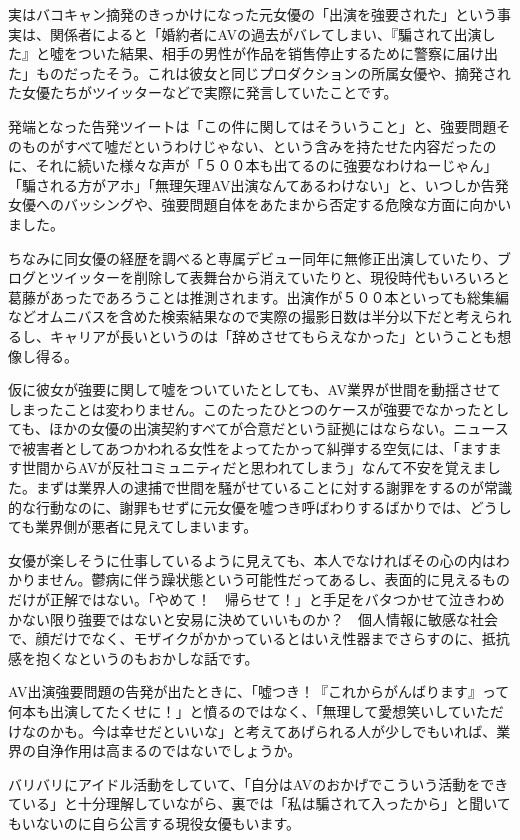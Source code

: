 \documentclass[12pt,UTF8]{ctexbook}
\begin{document}
実はバコキャン摘発のきっかけになった元女優の「出演を強要された」という事実は、関係者によると「婚約者にAVの過去がバレてしまい、『騙されて出演した』と噓をついた結果、相手の男性が作品を销售停止するために警察に届け出た」ものだったそう。これは彼女と同じプロダクションの所属女優や、摘発された女優たちがツイッターなどで実際に発言していたことです。

発端となった告発ツイートは「この件に関してはそういうこと」と、強要問題そのものがすべて噓だというわけじゃない、という含みを持たせた内容だったのに、それに続いた様々な声が「５００本も出てるのに強要なわけねーじゃん」「騙される方がアホ」「無理矢理AV出演なんてあるわけない」と、いつしか告発女優へのバッシングや、強要問題自体をあたまから否定する危険な方面に向かいました。

ちなみに同女優の経歴を調べると専属デビュー同年に無修正出演していたり、ブログとツイッターを削除して表舞台から消えていたりと、現役時代もいろいろと葛藤があったであろうことは推測されます。出演作が５００本といっても総集編などオムニバスを含めた検索結果なので実際の撮影日数は半分以下だと考えられるし、キャリアが長いというのは「辞めさせてもらえなかった」ということも想像し得る。

仮に彼女が強要に関して噓をついていたとしても、AV業界が世間を動揺させてしまったことは変わりません。このたったひとつのケースが強要でなかったとしても、ほかの女優の出演契約すべてが合意だという証拠にはならない。ニュースで被害者としてあつかわれる女性をよってたかって糾弾する空気には、「ますます世間からAVが反社コミュニティだと思われてしまう」なんて不安を覚えました。まずは業界人の逮捕で世間を騒がせていることに対する謝罪をするのが常識的な行動なのに、謝罪もせずに元女優を噓つき呼ばわりするばかりでは、どうしても業界側が悪者に見えてしまいます。

女優が楽しそうに仕事しているように見えても、本人でなければその心の内はわかりません。鬱病に伴う躁状態という可能性だってあるし、表面的に見えるものだけが正解ではない。「やめて！　帰らせて！」と手足をバタつかせて泣きわめかない限り強要ではないと安易に決めていいものか？　個人情報に敏感な社会で、顔だけでなく、モザイクがかかっているとはいえ性器までさらすのに、抵抗感を抱くなというのもおかしな話です。

AV出演強要問題の告発が出たときに、「噓つき！『これからがんばります』って何本も出演してたくせに！」と憤るのではなく、「無理して愛想笑いしていただけなのかも。今は幸せだといいな」と考えてあげられる人が少しでもいれば、業界の自浄作用は高まるのではないでしょうか。

バリバリにアイドル活動をしていて、「自分はAVのおかげでこういう活動をできている」と十分理解していながら、裏では「私は騙されて入ったから」と聞いてもいないのに自ら公言する現役女優もいます。
\end{document}
